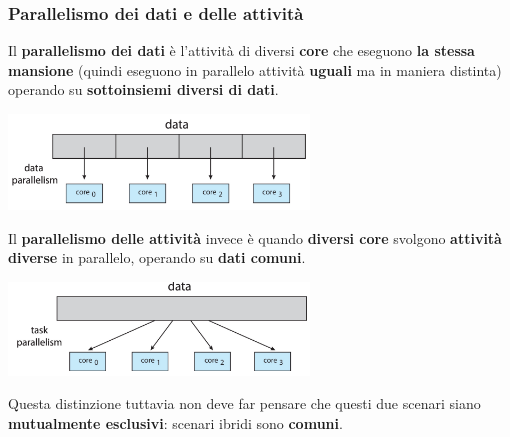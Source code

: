 \documentclass[12pt]{article}
\begin{document}
\subsubsection{Parallelismo dei dati e delle attività}
Il \textbf{parallelismo dei dati} è l'attività di diversi \textbf{core} che eseguono \textbf{la stessa mansione} (quindi eseguono in parallelo attività \textbf{uguali} ma in maniera distinta) operando su \textbf{sottoinsiemi diversi di dati}.
\begin{center}
    \includegraphics[width = 0.60\textwidth]{Images/47.png}
\end{center}
Il \textbf{parallelismo delle attività} invece è quando \textbf{diversi core} svolgono \textbf{attività diverse} in parallelo, operando su \textbf{dati comuni}.
\begin{center}
    \includegraphics[width = 0.60\textwidth]{Images/48.png}
\end{center}
Questa distinzione tuttavia non deve far pensare che questi due scenari siano \textbf{mutualmente esclusivi}: scenari ibridi sono \textbf{comuni}.
\end{document}
